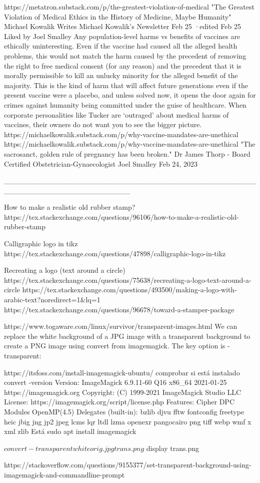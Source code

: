 https://metatron.substack.com/p/the-greatest-violation-of-medical
"The Greatest Violation of Medical Ethics in the History of Medicine, Maybe Humanity"
Michael Kowalik
Writes Michael Kowalik’s Newsletter
Feb 25
·edited Feb 25
Liked by Joel Smalley
Any population-level harms vs benefits of vaccines are ethically uninteresting. Even if the vaccine had caused all the alleged health problems, this would not match the harm caused by the precedent of removing the right to free medical consent (for any reason) and the precedent that it is morally permissible to kill an unlucky minority for the alleged benefit of the majority. This is the kind of harm that will affect future generations even if the present vaccine were a placebo, and unless solved now, it opens the door again for crimes against humanity being committed under the guise of healthcare. When corporate personalities like Tucker are ‘outraged’ about medical harms of vaccines, their owners do not want you to see the bigger picture. https://michaelkowalik.substack.com/p/why-vaccine-mandates-are-unethical
https://michaelkowalik.substack.com/p/why-vaccine-mandates-are-unethical
"The sacrosanct, golden rule of pregnancy has been broken." Dr James Thorp - Board Certified Obstetrician-Gynaecologist
Joel Smalley
Feb 24, 2023












________________________________________________________________________


How to make a realistic old rubber stamp?
https://tex.stackexchange.com/questions/96106/how-to-make-a-realistic-old-rubber-stamp


Calligraphic logo in tikz
https://tex.stackexchange.com/questions/47898/calligraphic-logo-in-tikz

Recreating a logo (text around a circle)
https://tex.stackexchange.com/questions/75638/recreating-a-logo-text-around-a-circle
https://tex.stackexchange.com/questions/493500/making-a-logo-with-arabic-text?noredirect=1&lq=1
https://tex.stackexchange.com/questions/96678/toward-a-stamper-package


https://www.togaware.com/linux/survivor/transparent-images.html
We can replace the white background of a JPG image with a transparent background to create a PNG image using convert from imagemagick. The key option is -transparent:


https://itsfoss.com/install-imagemagick-ubuntu/
comprobar si está instalado
convert -version
Version: ImageMagick 6.9.11-60 Q16 x86_64 2021-01-25 https://imagemagick.org
Copyright: (C) 1999-2021 ImageMagick Studio LLC
License: https://imagemagick.org/script/license.php
Features: Cipher DPC Modules OpenMP(4.5) 
Delegates (built-in): bzlib djvu fftw fontconfig freetype heic jbig jng jp2 jpeg lcms lqr ltdl lzma openexr pangocairo png tiff webp wmf x xml zlib
Está
sudo apt install imagemagick


$ convert -transparent white orig.jpg trans.png
$ display trans.png


https://stackoverflow.com/questions/9155377/set-transparent-background-using-imagemagick-and-commandline-prompt
















